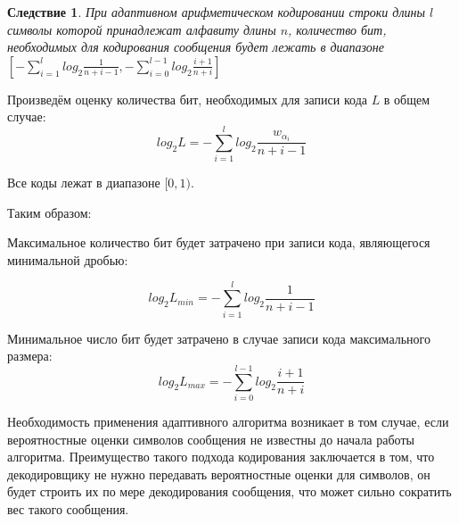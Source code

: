 \documentclass[12pt]{article}
\begin{document}
\newtheorem{Cons}{Следствие}
\begin{Cons}
При адаптивном арифметическом кодировании строки длины $l$ символы которой принадлежат алфавиту длины $n$, количество бит, необходимых для кодирования сообщения будет лежать в диапазоне $[-\sum_{i=1}^{l} log_2{\frac{1}{n+i-1}}, -\sum_{i=0}^{l-1}log_2\frac{i+1}{n+i}]$
\end{Cons}

\begin{Proof}
Произведём оценку количества бит, необходимых для записи кода $L$ в общем случае:
\[
log_2 L = -\sum_{i=1}^{l} log_2 \frac{w_{\alpha_i}}{n+i-1}
\]

Все коды лежат в диапазоне $[0, 1)$. 

Таким образом:

Максимальное количество бит будет затрачено при записи кода, являющегося минимальной дробью:

\[
log_2 L_{min} = -\sum_{i=1}^{l} log_2 \frac{1}{n+i-1}
\]

Минимальное число бит будет затрачено в случае записи кода максимального размера:
\[
log_2 L_{max} = -\sum_{i=0}^{l-1} log_2 \frac{i+1}{n+i}
\]
\end{Proof}

Необходимость применения адаптивного алгоритма возникает в том случае, если вероятностные оценки символов сообщения не известны до начала работы алгоритма. Преимущество такого подхода кодирования заключается в том, что декодировщику не нужно передавать вероятностные оценки для символов, он будет строить их по мере декодирования сообщения, что может сильно сократить вес такого сообщения. 
\end{document}
